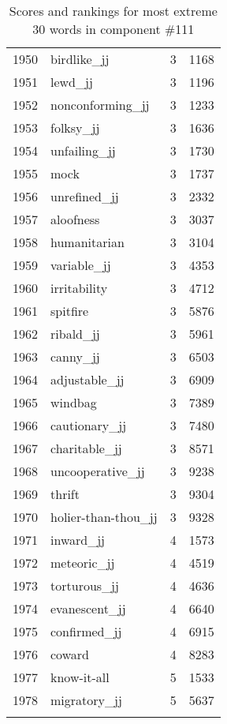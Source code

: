 \begin{longtable}[!htbp]{| rlr@{.}l |}
    1950 & birdlike\_jj & 3 & 1168 \\
    1951 & lewd\_jj & 3 & 1196 \\
    1952 & nonconforming\_jj & 3 & 1233 \\
    1953 & folksy\_jj & 3 & 1636 \\
    1954 & unfailing\_jj & 3 & 1730 \\
    1955 & mock & 3 & 1737 \\
    1956 & unrefined\_jj & 3 & 2332 \\
    1957 & aloofness & 3 & 3037 \\
    1958 & humanitarian & 3 & 3104 \\
    1959 & variable\_jj & 3 & 4353 \\
    1960 & irritability & 3 & 4712 \\
    1961 & spitfire & 3 & 5876 \\
    1962 & ribald\_jj & 3 & 5961 \\
    1963 & canny\_jj & 3 & 6503 \\
    1964 & adjustable\_jj & 3 & 6909 \\
    1965 & windbag & 3 & 7389 \\
    1966 & cautionary\_jj & 3 & 7480 \\
    1967 & charitable\_jj & 3 & 8571 \\
    1968 & uncooperative\_jj & 3 & 9238 \\
    1969 & thrift & 3 & 9304 \\
    1970 & holier-than-thou\_jj & 3 & 9328 \\
    1971 & inward\_jj & 4 & 1573 \\
    1972 & meteoric\_jj & 4 & 4519 \\
    1973 & torturous\_jj & 4 & 4636 \\
    1974 & evanescent\_jj & 4 & 6640 \\
    1975 & confirmed\_jj & 4 & 6915 \\
    1976 & coward & 4 & 8283 \\
    1977 & know-it-all & 5 & 1533 \\
    1978 & migratory\_jj & 5 & 5637 \\
    \hline
    \caption{Scores and rankings for most extreme 30 words in component \#111} \\
\end{longtable}
